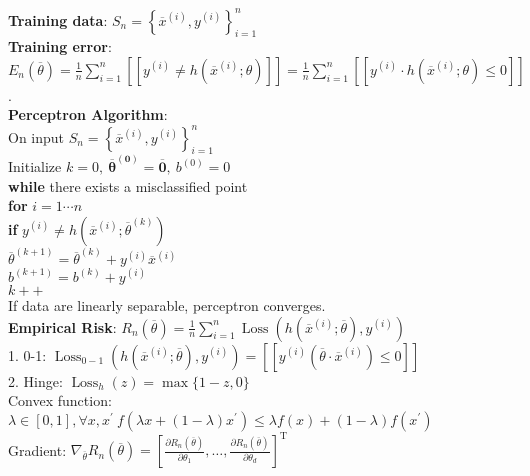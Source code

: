 \documentclass[10pt, letterpaper]{article}
\begin{document}
\begin{multicols*}{2}
\noindent 
\textbf{Training data}: $S_{n}=\left\{\overline{x}^{(i)}, y^{(i)}\right\}_{i=1}^{n}$\\
\textbf{Training error}: $E_{n}(\overline{\theta})=\frac{1}{n} \sum_{i=1}^{n} [[ y^{(i)} \neq h\left(\overline{{x}}^{(i)} ; \theta\right)]]=\frac{1}{n} \sum_{i=1}^{n} [[ y^{(i)} \cdot h\left(\overline{{x}}^{(i)} ; \theta\right) \le 0]]$.\\
\textbf{Perceptron Algorithm}:\\
On input $S_{n}=\left\{\overline{x}^{(i)}, y^{(i)}\right\}_{i=1}^{n}$\\
Initialize $k=0, ~\overline{\boldsymbol{\theta}}^{(\mathbf{0})}=\overline{\boldsymbol{0}},~b^{(0)} = 0$\\
\textbf{while} there exists a misclassified point\\
\hspace*{2ex} \textbf{for} $i=1\cdots n$\\
\hspace*{4ex} \textbf{if} $y^{(i)} \neq h\left(\overline{x}^{(i)} ; \overline{\theta}^{(k)}\right)$\\
\hspace*{6ex}  $\overline{\theta}^{(k+1)}=\overline{\theta}^{(k)}+y^{(i)} \overline{x}^{(i)}$\\
\hspace*{6ex} $b^{(k+1)} = b^{(k)} + y^{(i)}$\\
\hspace*{6ex} $k++$\\
If data are linearly separable, perceptron converges.\\
\textbf{Empirical Risk}: $R_{n}(\overline{\theta})=\frac{1}{n} \sum_{i=1}^{n} \operatorname{Loss}\left(h\left(\overline{x}^{(i)} ; \overline{\theta}\right), y^{(i)}\right)$\\
1. 0-1: $\operatorname{Loss}_{0-1}\left(h\left(\overline{x}^{(i)} ; \overline{\theta}\right), y^{(i)}\right) =[[ y^{(i)}\left(\overline{\theta} \cdot \overline{x}^{(i)}\right) \leq 0 ]]$\\
2. Hinge: $\operatorname{Loss}_{h}(z)=\max \{1-z, 0\}$\\
Convex function: $\lambda \in [0,1], \forall x, x^{\prime}~ f\left(\lambda x+(1-\lambda) x^{\prime}\right) \leq \lambda f(x)+(1-\lambda) f\left(x^{\prime}\right)$\\
Gradient: $\nabla_{\overline{\theta}} R_{n}(\overline{\theta})=\left[\frac{\partial R_{n}(\overline{\theta})}{\partial \theta_{1}}, \dots, \frac{\partial R_{n}(\overline{\theta})}{\partial \theta_{d}}\right]^{\mathrm{T}}$\\

\end{multicols*}
\end{document}
